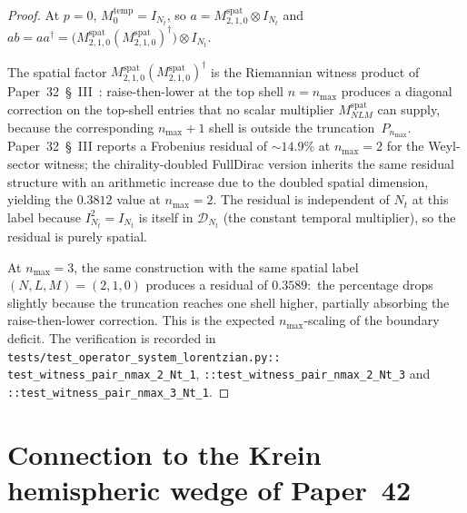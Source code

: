 \documentclass[11pt,a4paper]{article}
\theoremstyle{plain}
\theoremstyle{definition}
\newcommand{\nmax}{n_{\max}}
\newcommand{\Nt}{N_t}
\newcommand{\spat}{\mathrm{spat}}
\newcommand{\temp}{\mathrm{temp}}
\begin{document}
\begin{proof}
At $p = 0$, $M_0^{\temp} = I_{\Nt}$, so
$a = M^{\spat}_{2,1,0} \otimes I_{\Nt}$ and
$ab = a a^\dagger = \bigl(M^{\spat}_{2,1,0} (M^{\spat}_{2,1,0})^\dagger\bigr)
      \otimes I_{\Nt}$.

The spatial factor
$M^{\spat}_{2,1,0} (M^{\spat}_{2,1,0})^\dagger$ is the Riemannian
witness product of Paper~32~\S~III~\cite{paper32}: raise-then-lower
at the top shell $n = \nmax$ produces a diagonal correction on the
top-shell entries that no scalar multiplier $M^{\spat}_{N L M}$ can
supply, because the corresponding $\nmax + 1$ shell is outside the
truncation~$P_{\nmax}$. Paper~32~\S~III reports a Frobenius residual
of $\sim 14.9\%$ at $\nmax = 2$ for the Weyl-sector witness; the
chirality-doubled FullDirac version inherits the same residual
structure with an arithmetic increase due to the doubled spatial
dimension, yielding the $0.3812$ value at $\nmax = 2$. The
residual is independent of $\Nt$ at this label because $I_{\Nt}^2 =
I_{\Nt}$ is itself in $\mathcal{D}_{\Nt}$ (the constant temporal
multiplier), so the residual is purely spatial.

At $\nmax = 3$, the same construction with the same spatial label
$(N, L, M) = (2, 1, 0)$ produces a residual of $0.3589$:\ the
percentage drops slightly because the truncation reaches one shell
higher, partially absorbing the raise-then-lower correction. This
is the expected $\nmax$-scaling of the boundary deficit. The
verification is recorded in
\texttt{tests/test\_operator\_system\_lorentzian.py::%
test\_witness\_pair\_nmax\_2\_Nt\_1}, \texttt{::test\_witness\_pair\_nmax\_2\_Nt\_3}
and \texttt{::test\_witness\_pair\_nmax\_3\_Nt\_1}.
\end{proof}

\section{Connection to the Krein hemispheric wedge of Paper~42}\label{sec:wedge}
\end{document}
